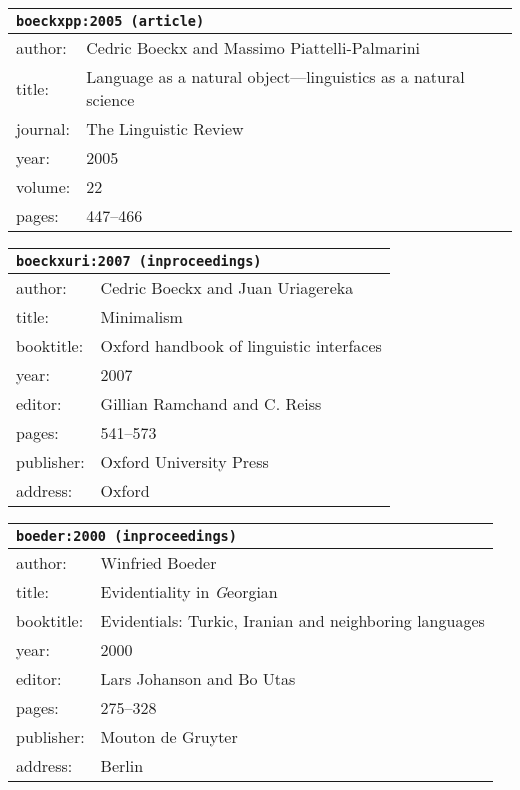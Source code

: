 \documentclass{article}
\begin{document}
\bigskip

\begin{tabular}{p{}p{}}
\multicolumn{2}{l}{\texttt{boeckxpp:2005 (article)}}\\
\hline
author: & Cedric Boeckx and Massimo Piattelli-Palmarini\\
title: & Language as a natural object---linguistics as a natural science\\
journal: & The Linguistic Review\\
year: & 2005\\
volume: & 22\\
pages: & 447--466\\
\end{tabular}

\bigskip

\begin{tabular}{p{}p{}}
\multicolumn{2}{l}{\texttt{boeckxuri:2007 (inproceedings)}}\\
\hline
author: & Cedric Boeckx and Juan Uriagereka\\
title: & Minimalism\\
booktitle: & Oxford handbook of linguistic interfaces\\
year: & 2007\\
editor: & Gillian Ramchand and C. Reiss\\
pages: & 541--573\\
publisher: & Oxford University Press\\
address: & Oxford\\
\end{tabular}

\bigskip

\begin{tabular}{p{}p{}}
\multicolumn{2}{l}{\texttt{boeder:2000 (inproceedings)}}\\
\hline
author: & Winfried Boeder\\
title: & Evidentiality in \textsc{{\it G}}eorgian\\
booktitle: & Evidentials: Turkic, Iranian and neighboring languages\\
year: & 2000\\
editor: & Lars Johanson and Bo Utas\\
pages: & 275--328\\
publisher: & Mouton de Gruyter\\
address: & Berlin\\
\end{tabular}
\end{document}
